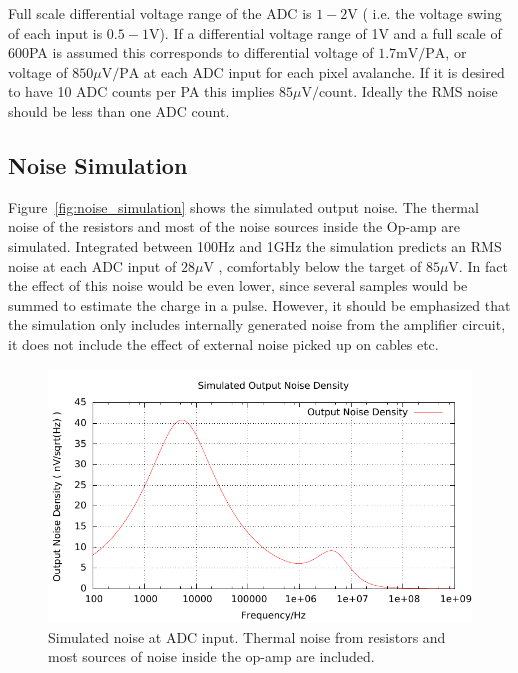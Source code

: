 \documentclass[
12pt, %
a4paper, %
oneside, %
headinclude,footinclude, %
apacite
]{scrartcl}
\begin{document}
Full scale differential voltage range of the ADC is $1-2\mathrm{V}$ ( i.e. the voltage swing of each input is $0.5-1\mathrm{V}$). If a differential voltage range of 1V and a full scale of 600PA is assumed this corresponds to differential voltage of $1.7\mathrm{mV}/\mathrm{PA}$, or voltage of $850\mu\mathrm{V}/\mathrm{PA}$ at each ADC input for each pixel avalanche. If it is desired to have 10 ADC counts per PA this implies $85\mu\mathrm{V}/\mathrm{count}$. Ideally the RMS noise should be less than one ADC count.

\subsection{Noise Simulation}

Figure~\vref{fig:noise_simulation} shows the simulated output
noise. The thermal noise of the resistors and most of the noise
sources inside the Op-amp are simulated. Integrated between 100Hz and
1GHz the simulation predicts an RMS noise at each ADC input of
$28\mu\mathrm{V}$ , comfortably below the target of
$85\mu\mathrm{V}$. In fact the effect of this noise would be even lower, since several samples would be summed to estimate the charge in a pulse. However, it should be emphasized that the
simulation only includes internally generated noise from the amplifier
circuit, it does not include the effect of external noise picked up on
cables etc.

\begin{figure}[tb]
\centering 
\includegraphics[width=\columnwidth]{SiPMT_test_mppc33_ada4932_v8_unipolar_noise.pdf}
\caption[Simulated output noise at  ADC input]{Simulated noise at  ADC input. Thermal noise from resistors and most sources of noise inside the op-amp are included.}
\label{fig:noise_simulation}
\end{figure}
\end{document}
